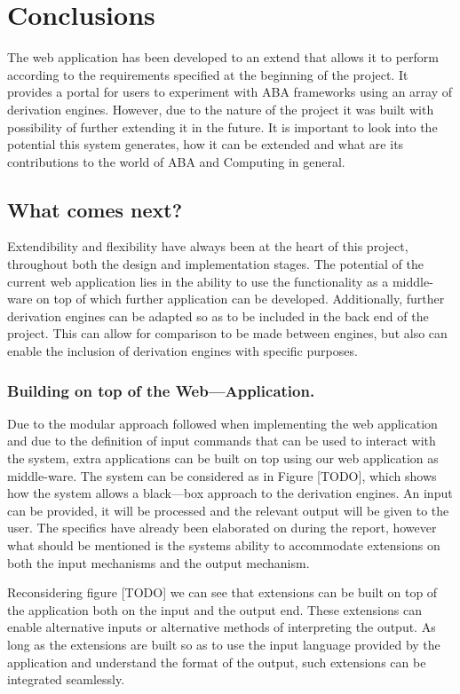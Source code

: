 \newpage

\chapter{Conclusions}

The web application has been developed to an extend that allows it to perform according to the requirements specified at the beginning of the project. It provides a portal for users to experiment with ABA frameworks using an array of derivation engines. However, due to the nature of the project it was built with possibility of further extending it in the future. It is important to look into the potential this system generates, how it can be extended and what are its contributions to the world of ABA and Computing in general.

\section{What comes next?}
Extendibility and flexibility have always been at the heart of this project, throughout both the design and implementation stages. The potential of the current web application lies in the ability to use the functionality as a middle-ware on top of which further application can be developed. Additionally, further derivation engines can be adapted so as to be included in the back end of the project. This can allow for comparison to be made between engines, but also can enable the inclusion of derivation engines with specific purposes.

\subsection{Building on top of the Web---Application.}
Due to the modular approach followed when implementing the web application and due to the definition of input commands that can be used to interact with the system, extra applications can be built on top using our web application as middle-ware. The system can be considered as in Figure [TODO], which shows how the system allows a black---box approach to the derivation engines. An input can be provided, it will be processed and the relevant output will be given to the user. The specifics have already been elaborated on during the report, however what should be mentioned is the systems ability to accommodate extensions on both the input mechanisms and the output mechanism. 

Reconsidering figure [TODO] we can see that extensions can be built on top of the application both on the input and the output end. These extensions can enable alternative inputs or alternative methods of interpreting the output. As long as the extensions are built so as to use the input language provided by the application and understand the format of the output, such extensions can be integrated seamlessly. 

